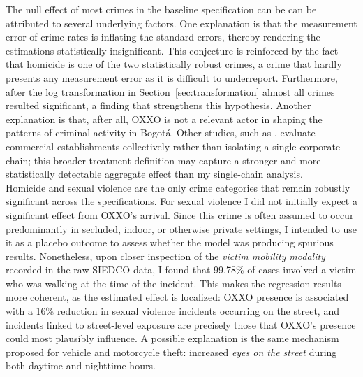 \documentclass[12pt]{article}
\begin{document}
The null effect of most crimes in the baseline specification can be can be attributed to several underlying factors. One explanation is that the measurement error of crime rates is inflating the standard errors, thereby rendering the estimations statistically insignificant. This conjecture is reinforced by the fact that homicide is one of the two statistically robust crimes, a crime that hardly presents any measurement error as it is difficult to underreport. Furthermore, after the log transformation in Section~\ref{sec:transformation} almost all crimes resulted significant, a finding that strengthens this hypothesis. Another explanation is that, after all, OXXO is not a relevant actor in shaping the patterns of criminal activity in Bogotá. Other studies, such as \textcite{feng2019aggravating, Davis2021, askey2018fast}, evaluate commercial establishments collectively rather than isolating a single corporate chain; this broader treatment definition may capture a stronger and more statistically detectable aggregate effect than my single-chain analysis.\\

Homicide and sexual violence are the only crime categories that remain robustly significant across the specifications. For sexual violence I did not initially expect a significant effect from OXXO's arrival. Since this crime is often assumed to occur predominantly in secluded, indoor, or otherwise private settings, I intended to use it as a placebo outcome to assess whether the model was producing spurious results. Nonetheless, upon closer inspection of the \textit{victim mobility modality} recorded in the raw SIEDCO data, I found that 99.78\% of cases involved a victim who was walking at the time of the incident. This makes the regression results more coherent, as the estimated effect is localized: OXXO presence is associated with a 16\% reduction in sexual violence incidents occurring on the street, and incidents linked to street-level exposure are precisely those that OXXO's presence could most plausibly influence. A possible explanation is the same mechanism proposed for vehicle and motorcycle theft: increased \textit{eyes on the street} during both daytime and nighttime hours.\\
\end{document}
